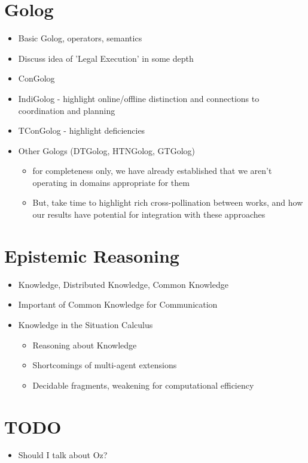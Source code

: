 \section{Golog}

\begin{itemize}
\item Basic Golog, operators, semantics
\item Discuss idea of 'Legal Execution' in some depth
\item ConGolog
\item IndiGolog - highlight online/offline distinction and connections to coordination and planning
\item TConGolog - highlight deficiencies
\item Other Gologs (DTGolog, HTNGolog, GTGolog)
  \begin{itemize}
  \item for completeness only, we have already established that we aren't operating in domains appropriate for them
  \item But, take time to highlight rich cross-pollination between works, and how our results have potential for integration with these approaches
  \end{itemize}
\end{itemize}

\section{Epistemic Reasoning}

\begin{itemize}
\item Knowledge, Distributed Knowledge, Common Knowledge
\item Important of Common Knowledge for Communication
\item Knowledge in the Situation Calculus
  \begin{itemize}
  \item Reasoning about Knowledge
  \item Shortcomings of multi-agent extensions
  \item Decidable fragments, weakening for computational efficiency
  \end{itemize}
\end{itemize}

\section{TODO}

\begin{itemize}
\item Should I talk about Oz?
\end{itemize}

